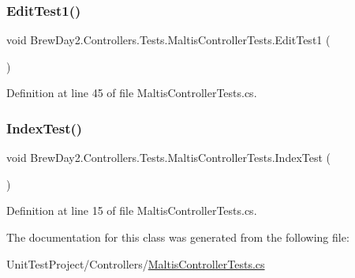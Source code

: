 \subsubsection{\texorpdfstring{Edit\+Test1()}{EditTest1()}}
{\footnotesize\ttfamily void Brew\+Day2.\+Controllers.\+Tests.\+Maltis\+Controller\+Tests.\+Edit\+Test1 (\begin{DoxyParamCaption}{ }\end{DoxyParamCaption})}



Definition at line 45 of file Maltis\+Controller\+Tests.\+cs.

\mbox{\label{class_brew_day2_1_1_controllers_1_1_tests_1_1_maltis_controller_tests_a344da41462291004deb0c57515e2f69b}} 
\subsubsection{\texorpdfstring{Index\+Test()}{IndexTest()}}
{\footnotesize\ttfamily void Brew\+Day2.\+Controllers.\+Tests.\+Maltis\+Controller\+Tests.\+Index\+Test (\begin{DoxyParamCaption}{ }\end{DoxyParamCaption})}



Definition at line 15 of file Maltis\+Controller\+Tests.\+cs.



The documentation for this class was generated from the following file\+:\begin{DoxyCompactItemize}
\item 
Unit\+Test\+Project/\+Controllers/\mbox{\hyperlink{_maltis_controller_tests_8cs}{Maltis\+Controller\+Tests.\+cs}}\end{DoxyCompactItemize}
